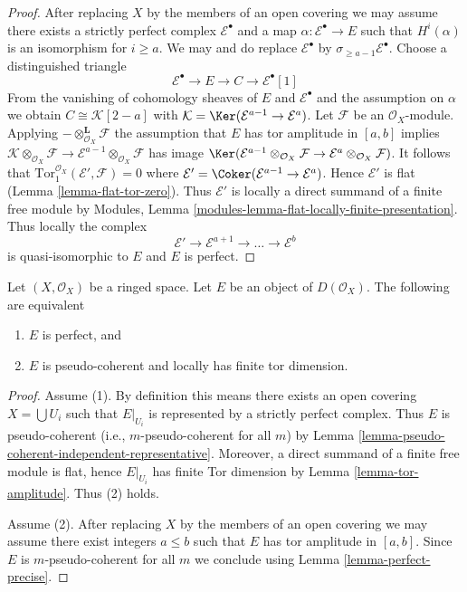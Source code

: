 \begin{proof}
After replacing $X$ by the members of an open covering we may assume there
exists a strictly perfect complex $\mathcal{E}^\bullet$ and a map
$\alpha : \mathcal{E}^\bullet \to E$ such that $H^i(\alpha)$ is an isomorphism
for $i \geq a$. We may and do replace $\mathcal{E}^\bullet$ by
$\sigma_{\geq a - 1}\mathcal{E}^\bullet$. Choose a distinguished triangle
$$
\mathcal{E}^\bullet \to E \to C \to \mathcal{E}^\bullet[1]
$$
From the vanishing of cohomology sheaves of $E$ and $\mathcal{E}^\bullet$
and the assumption on $\alpha$ we obtain $C \cong \mathcal{K}[2 - a]$ with
$\mathcal{K} = \Ker(\mathcal{E}^{a - 1} \to \mathcal{E}^a)$.
Let $\mathcal{F}$ be an $\mathcal{O}_X$-module.
Applying $- \otimes_{\mathcal{O}_X}^\mathbf{L} \mathcal{F}$
the assumption that $E$ has tor amplitude in $[a, b]$
implies $\mathcal{K} \otimes_{\mathcal{O}_X} \mathcal{F} \to
\mathcal{E}^{a - 1} \otimes_{\mathcal{O}_X} \mathcal{F}$ has image
$\Ker(\mathcal{E}^{a - 1} \otimes_{\mathcal{O}_X} \mathcal{F}
\to \mathcal{E}^a \otimes_{\mathcal{O}_X} \mathcal{F})$.
It follows that $\text{Tor}_1^{\mathcal{O}_X}(\mathcal{E}', \mathcal{F}) = 0$
where $\mathcal{E}' = \Coker(\mathcal{E}^{a - 1} \to \mathcal{E}^a)$.
Hence $\mathcal{E}'$ is flat (Lemma \ref{lemma-flat-tor-zero}).
Thus $\mathcal{E}'$ is locally a direct summand of a finite free module by
Modules, Lemma \ref{modules-lemma-flat-locally-finite-presentation}.
Thus locally the complex
$$
\mathcal{E}' \to \mathcal{E}^{a + 1} \to \ldots \to \mathcal{E}^b
$$
is quasi-isomorphic to $E$ and $E$ is perfect.
\end{proof}

\begin{lemma}
\label{lemma-perfect}
Let $(X, \mathcal{O}_X)$ be a ringed space.
Let $E$ be an object of $D(\mathcal{O}_X)$.
The following are equivalent
\begin{enumerate}
\item $E$ is perfect, and
\item $E$ is pseudo-coherent and locally has finite tor dimension.
\end{enumerate}
\end{lemma}

\begin{proof}
Assume (1). By definition this means there exists an open covering
$X = \bigcup U_i$ such that $E|_{U_i}$ is represented by a
strictly perfect complex. Thus $E$ is pseudo-coherent (i.e.,
$m$-pseudo-coherent for all $m$) by
Lemma \ref{lemma-pseudo-coherent-independent-representative}.
Moreover, a direct summand of a finite free module is flat, hence
$E|_{U_i}$ has finite Tor dimension by
Lemma \ref{lemma-tor-amplitude}. Thus (2) holds.

\medskip\noindent
Assume (2). After replacing $X$ by the members of an open covering
we may assume there exist integers $a \leq b$ such that $E$
has tor amplitude in $[a, b]$. Since $E$ is $m$-pseudo-coherent
for all $m$ we conclude using Lemma \ref{lemma-perfect-precise}.
\end{proof}

